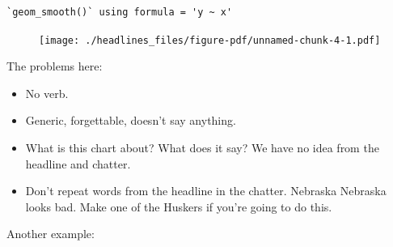 \documentclass[
  letterpaper,
  DIV=11,
  numbers=noendperiod]{scrreprt}
\providecommand{\tightlist}{%
  \setlength{\itemsep}{0pt}\setlength{\parskip}{0pt}}\usepackage{longtable,booktabs,array}
\begin{document}
\begin{verbatim}
`geom_smooth()` using formula = 'y ~ x'
\end{verbatim}

\begin{figure}[H]

{\centering \texttt{[image: ./headlines\_files/figure-pdf/unnamed-chunk-4-1.pdf]}

}

\end{figure}

The problems here:

\begin{itemize}
\tightlist
\item
  No verb.
\item
  Generic, forgettable, doesn't say anything.
\item
  What is this chart about? What does it say? We have no idea from the
  headline and chatter.
\item
  Don't repeat words from the headline in the chatter. Nebraska Nebraska
  looks bad. Make one of the Huskers if you're going to do this.
\end{itemize}

Another example:
\end{document}
